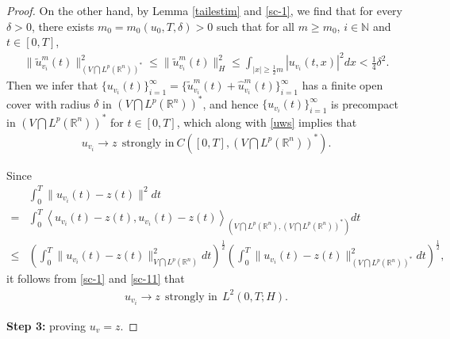 \documentclass[11pt]{article}
\numberwithin{equation}{section}
\theoremstyle{plain}
\def\geq{\geqslant}
\def\leq{\leqslant}
\begin{document}
\begin{proof}
    On the other hand, by Lemma \ref{tailestim} and \eqref{sc-1},
    we find that for every $\delta>0$,
    there exists
    $m_0 = m_0 (u_0, T,  \delta ) > 0$
    such that for all $m \geq m_0$, $i \in \mathbb{N}$ and $t \in [0,T]$,
    \begin{align*}
        \| \widetilde{u}_{v_i}^m(t)
        \|_{\left( V \bigcap L^p(\mathbb{R}^n) \right)^\ast}^2
        \leq
        \| \widetilde{u}_{v_i}^m(t)
        \|_{H}^2
        \leq \int_{|x| \geq {\frac 12}  m}
        |u_{v_i}(t,x)|^2
        dx
        < \frac{1}{4}  \delta^2.
    \end{align*}
    Then we infer that
    $\{ u_{v_i}(t) \}_{i=1}^\infty
    =
    \{ \widetilde{u}_{v_i}^m(t)
    + \widehat{u}_{v_i}^m(t)
    \}_{i=1}^\infty$
    has a finite open cover with radius $\delta$ in
    $\left( V \bigcap L^p(\mathbb{R}^n) \right)^\ast$,
    and hence
    $
    \{ u_{v_i}(t) \}_{i=1}^\infty
    $
    is precompact in
    $\left( V \bigcap L^p(\mathbb{R}^n) \right)^\ast$
    for  $t \in [0,T]$,
    which along with \eqref{uws}
    implies that
    \begin{align} \label{sc-11}
        u_{v_i} \rightarrow  z  \ \  \text{strongly in} \  C \left( [0,T], \left( V \bigcap L^p(\mathbb{R}^n) \right)^\ast \right).
    \end{align}

    Since
    \begin{align*}
        & \int_0^T \| u_{v_i}(t) - z(t) \|^2 dt  \nonumber \\
        = & \int_0^T
        \left\langle  u_{v_i}(t) - z(t),
        u_{v_i}(t) - z(t)
        \right\rangle_{\left( V \bigcap L^p(\mathbb{R}^n), \left( V \bigcap L^p(\mathbb{R}^n) \right)^\ast \right)} dt
        \nonumber \\
        \leq & \left( \int_0^T
        \| u_{v_i}(t) - z(t) \|_{V \bigcap L^p(\mathbb{R}^n)}^2 dt
        \right)^{\frac{1}{2}}
        \left( \int_0^T
        \| u_{v_i}(t) - z(t) \|_{\left( V \bigcap L^p(\mathbb{R}^n) \right)^\ast}^2 dt
        \right)^{\frac{1}{2}},
    \end{align*}
    it follows from \eqref{sc-1} and \eqref{sc-11} that
    \begin{align*}
        u_{v_i}  \rightarrow  z  \ \  \text{strongly in} \ \  L^2(0,T; H).
    \end{align*}


    {\bf Step 3:}   proving  $u_v = z$.


\end{proof}
\end{document}
